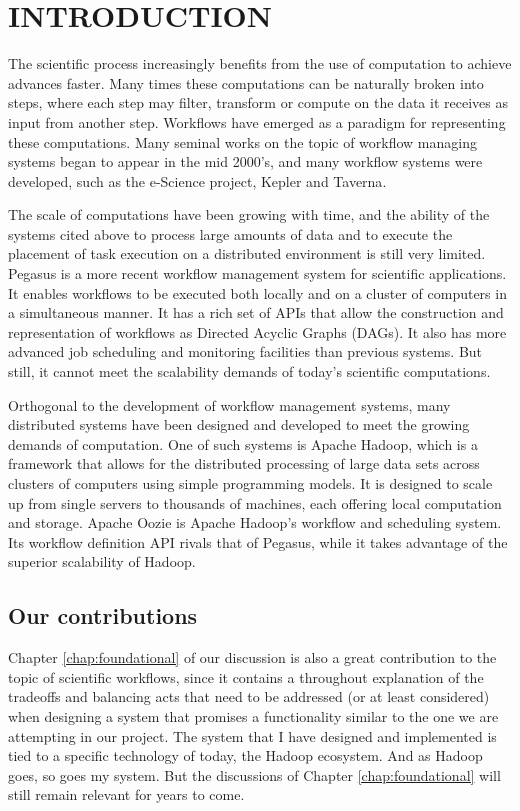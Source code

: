 \chapter{INTRODUCTION}

The scientific process increasingly benefits from the use of computation to achieve advances faster. Many times these computations can be naturally broken into steps, where each step may filter, transform or compute on the data it receives as input from another step.  Workflows have emerged as a paradigm for representing these computations. Many seminal works on the topic of workflow managing systems began to appear in the mid 2000's\cite{yu2005taxonomy, fox2006special, gil2007examining}, and many workflow systems were developed, such as the e-Science project\cite{deelman2009workflows}, Kepler\cite{altintas2004kepler} and Taverna\cite{oinn2006taverna}.  

The scale of computations have been growing with time, and the ability of the systems cited above to process large amounts of data and to execute the placement of task execution on a distributed environment is still very limited.  Pegasus\cite{singh2008workflow} is a more recent workflow management system for scientific applications.  It enables workflows to be executed both locally and on a cluster of computers in a simultaneous manner.  It has a rich set of APIs that allow the construction and representation of workflows as Directed Acyclic Graphs (DAGs).  It also has more advanced job scheduling and monitoring facilities than previous systems.  But still, it cannot meet the scalability demands of today's scientific computations.  

Orthogonal to the development of workflow management systems, many distributed systems have been designed and developed to meet the growing demands of computation.  One of such systems is Apache Hadoop, which is a framework that allows for the distributed processing of large data sets across clusters of computers using simple programming models. It is designed to scale up from single servers to thousands of machines, each offering local computation and storage. Apache Oozie\cite{islam2012oozie} is Apache Hadoop's workflow and scheduling system.  Its workflow definition API rivals that of Pegasus, while it takes advantage of the superior scalability of Hadoop.


\section{Our contributions}
Chapter \ref{chap:foundational} of our discussion is also a great contribution to the topic of scientific workflows, since it contains a throughout explanation of the tradeoffs and balancing acts that need to be addressed (or at least considered) when designing a system that promises a functionality similar to the one we are attempting in our project. The system that I have designed and implemented is tied to a specific technology of today, the Hadoop ecosystem.  And as Hadoop goes, so goes my system.  But the discussions of Chapter \ref{chap:foundational} will still remain relevant for years to come.
